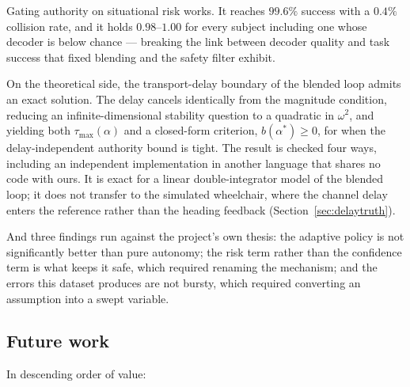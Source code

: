 \documentclass[11pt,a4paper]{article}
\newcommand{\astar}{\alpha^{*}}
\theoremstyle{plain}
\theoremstyle{definition}
\begin{document}
Gating authority on situational risk works. It reaches $99.6\%$ success
with a $0.4\%$ collision rate, and it holds $0.98$--$1.00$ for every
subject including one whose decoder is below chance --- breaking the
link between decoder quality and task success that fixed blending and
the safety filter exhibit.

On the theoretical side, the transport-delay boundary of the blended
loop admits an exact solution. The delay cancels identically from the
magnitude condition, reducing an infinite-dimensional stability question
to a quadratic in $\omega^2$, and yielding both $\tau_{\max}(\alpha)$
and a closed-form criterion, $b(\astar) \ge 0$, for when the
delay-independent authority bound is tight. The result is checked four
ways, including an independent implementation in another language that
shares no code with ours. It is exact for a linear double-integrator
model of the blended loop; it does not transfer to the simulated
wheelchair, where the channel delay enters the reference rather than
the heading feedback (Section~\ref{sec:delaytruth}).

And three findings run against the project's own thesis: the adaptive
policy is not significantly better than pure autonomy; the risk term
rather than the confidence term is what keeps it safe, which required
renaming the mechanism; and the errors this dataset produces are not
bursty, which required converting an assumption into a swept variable.

\subsection{Future work}
\label{sec:future}

In descending order of value:
\end{document}
